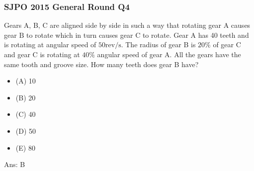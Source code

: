 \documentclass{article}
\begin{document}
\subsubsection{SJPO 2015 General Round Q4}
Gears A, B, C are aligned side by side in such a way that rotating gear A causes gear $\mathrm{B}$ to rotate which in turn causes gear $\mathrm{C}$ to rotate. Gear A has 40 teeth and is rotating at angular speed of $50 \mathrm{rev} / \mathrm{s}$. The radius of gear B is $20 \%$ of gear $\mathrm{C}$ and gear $\mathrm{C}$ is rotating at $40 \%$ angular speed of gear $\mathrm{A}$. All the gears have the same tooth and groove size. How many teeth does gear B have?
\begin{itemize}
\item[] (A) 10
\item[] (B) 20
\item[] (C) 40
\item[] (D) 50
\item[] (E) 80
\end{itemize}
Ans: \ifpaper B \fi
\end{document}

